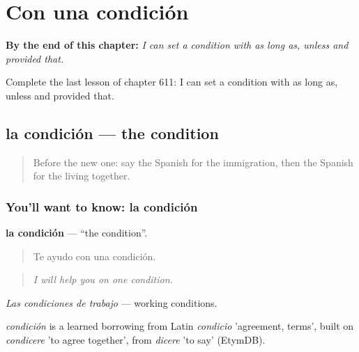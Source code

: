 
\chapter{Con una condición}
\label{ch:es-con-una-condicion}

\begin{chapteropening}
\textbf{By the end of this chapter:} \emph{I can set a condition with as long as, unless and provided that.}

Complete the last lesson of chapter 611: I can set a condition with as long as, unless and provided that.
\end{chapteropening}

\section[la condición]{la condición — the condition}

\label{lesson:ES-C611-condicion}



\begin{quote}
Before the new one: say the Spanish for the immigration, then the Spanish for the living together.
\end{quote}

\subsection*{You'll want to know: la condición}
\textbf{la condición} — \textquotedblleft{}the condition\textquotedblright{}.

\begin{quote}
Te ayudo con una condición.
\end{quote}

\begin{quote}
\emph{I will help you on one condition.}
\end{quote}

\emph{Las condiciones de trabajo} — working conditions.

\begin{cousinweb}
\emph{condición} is a learned borrowing from Latin \emph{condicio} 'agreement, terms', built on \emph{condicere} 'to agree together', from \emph{dicere} 'to say' (EtymDB).
\end{cousinweb}

